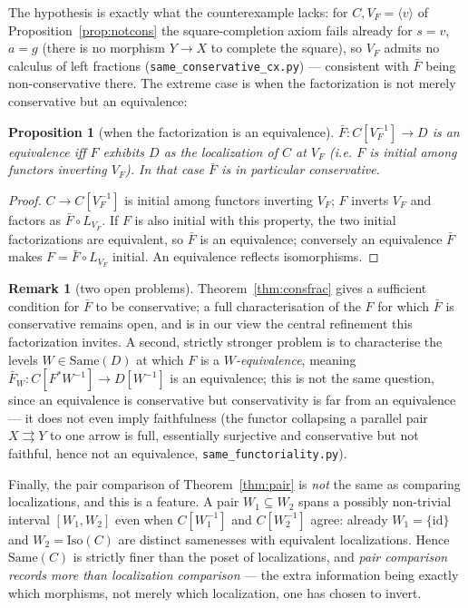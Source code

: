 \documentclass[11pt]{amsart}
\newtheorem{prop}[thm]{Proposition}
\theoremstyle{definition}
\newtheorem{rem}[thm]{Remark}
\newcommand{\Same}{\mathrm{Same}}
\newcommand{\Iso}{\mathrm{Iso}}
\newcommand{\Fstar}{F^{*}}
\begin{document}
The hypothesis is exactly what the counterexample lacks: for
$C,V_F=\langle v\rangle$ of Proposition~\ref{prop:notcons} the square-completion
axiom fails already for $s=v$, $a=g$ (there is no morphism $Y\to X$ to complete
the square), so $V_F$ admits no calculus of left fractions
(\texttt{same\_conservative\_cx.py}) --- consistent with $\bar F$ being
non-conservative there. The extreme case is when the factorization is not merely
conservative but an equivalence:

\begin{prop}[when the factorization is an equivalence]\label{prop:equiv}
$\bar F\colon C[V_F^{-1}]\to D$ is an equivalence iff $F$ exhibits $D$ as the
localization of $C$ at $V_F$ (i.e. $F$ is initial among functors inverting
$V_F$). In that case $\bar F$ is in particular conservative.
\end{prop}

\begin{proof}
$C\to C[V_F^{-1}]$ is initial among functors inverting $V_F$; $F$ inverts $V_F$
and factors as $\bar F\circ L_{V_F}$. If $F$ is also initial with this property,
the two initial factorizations are equivalent, so $\bar F$ is an equivalence;
conversely an equivalence $\bar F$ makes $F=\bar F\circ L_{V_F}$ initial. An
equivalence reflects isomorphisms.
\end{proof}

\begin{rem}[two open problems]\label{rem:consopen}
Theorem~\ref{thm:consfrac} gives a sufficient condition for $\bar F$ to be
conservative; a full characterisation of the $F$ for which $\bar F$ is
conservative remains open, and is in our view the central refinement this
factorization invites. A second, strictly stronger problem is to characterise
the levels $W\in\Same(D)$ at which $F$ is a \emph{$W$-equivalence}, meaning
$\bar F_W\colon C[\Fstar W^{-1}]\to D[W^{-1}]$ is an equivalence; this is not the
same question, since an equivalence is conservative but conservativity is far
from an equivalence --- it does not even imply faithfulness (the functor
collapsing a parallel pair $X\rightrightarrows Y$ to one arrow is full,
essentially surjective and conservative but not faithful, hence not an
equivalence, \texttt{same\_functoriality.py}).
\end{rem}

Finally, the pair comparison of Theorem~\ref{thm:pair} is \emph{not} the same as
comparing localizations, and this is a feature. A pair $W_1\subseteq W_2$ spans a
possibly non-trivial interval $[W_1,W_2]$ even when $C[W_1^{-1}]$ and
$C[W_2^{-1}]$ agree: already $W_1=\{\mathrm{id}\}$ and $W_2=\Iso(C)$ are distinct
samenesses with equivalent localizations. Hence $\Same(C)$ is strictly finer than
the poset of localizations, and \emph{pair comparison records more than
localization comparison} --- the extra information being exactly which morphisms,
not merely which localization, one has chosen to invert.
\end{document}
